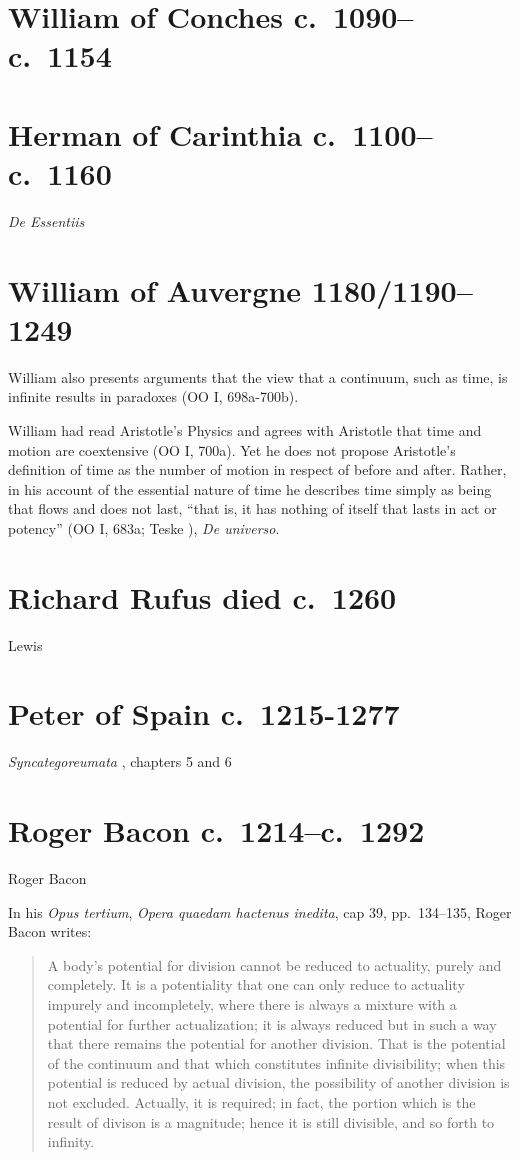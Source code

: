 \documentclass{article}
\begin{document}
\section{William of Conches c.~1090--c.~1154}

\section{Herman of Carinthia c.~1100--c.~1160}
{\em De Essentiis} \cite[p.~252]{essentiis}


\section{William of Auvergne 1180/1190--1249}
William also presents arguments that the view that a continuum, such as time, is infinite results in paradoxes (OO I, 698a-700b).

William had read Aristotle's Physics and agrees with Aristotle that time and motion are coextensive (OO I, 700a). Yet he does not propose Aristotle's definition of time as the number of motion in respect of before and after. Rather, in his account of the essential nature of time he describes time simply as being that flows and does not last, ``that is, it has nothing of itself that lasts in act or potency'' (OO I, 683a; Teske \cite[p.~102]{teske}), {\em De universo}.




\section{Richard Rufus died c.~1260}
Lewis \cite{lewis2012}



\section{Peter of Spain c.~1215-1277}
{\em Syncategoreumata} \cite{hispanus}, chapters 5 and 6


\section{Roger Bacon c.~1214--c.~1292}
Roger Bacon \cite[p.~396]{grant1974}

In his {\em Opus tertium}, {\em Opera quaedam hactenus inedita}, cap 39, pp.~134--135, Roger Bacon writes:\cite[p.~46]{ariew}
\begin{quote}
A body's potential for division cannot be reduced to actuality, purely and completely. It is a potentiality that one can only reduce to actuality impurely and incompletely,
where there is always a mixture with a potential for further actualization; it is always reduced but in such a way that there remains the potential for another division.
That is the potential of the continuum and that which constitutes infinite divisibility; when this potential is reduced by actual division, the possibility of another division is not
excluded. Actually, it is required; in fact, the portion which is the result of divison is a magnitude; hence it is still divisible, and so forth to infinity.
\end{quote}
\end{document}
